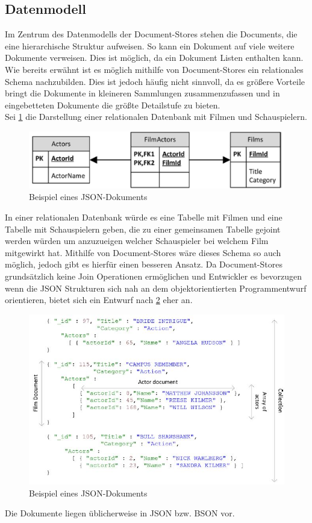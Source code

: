\subsection{Datenmodell}
Im Zentrum des Datenmodells der Document-Stores stehen die Documents, die eine hierarchische Struktur aufweisen. So kann ein Dokument auf viele weitere Dokumente verweisen. Dies ist möglich, da ein Dokument Listen enthalten kann. 
\\

Wie bereits erwähnt ist es möglich mithilfe von Document-Stores ein relationales Schema nachzubilden. Dies ist jedoch häufig nicht sinnvoll, da es größere Vorteile bringt die Dokumente in kleineren Sammlungen zusammenzufassen und in eingebetteten Dokumente die größte Detailstufe zu bieten. 
\\

Sei \ref{fig:doc2} die Darstellung einer relationalen Datenbank mit Filmen und Schauspielern.
\begin{figure}
	\centering
	\includegraphics[scale=0.4]{images/docstores_2.jpg} 
	\caption{Beispiel eines JSON-Dokuments}\label{fig:doc2}
\end{figure}
In einer relationalen Datenbank würde es eine Tabelle mit Filmen und eine Tabelle mit Schauspielern geben, die zu einer gemeinsamen Tabelle gejoint werden würden um anzuzueigen welcher Schauspieler bei welchem Film mitgewirkt hat. Mithilfe von Document-Stores wäre dieses Schema so auch möglich, jedoch gibt es hierfür einen besseren Ansatz. Da Document-Stores grundsätzlich keine Join Operationen ermöglichen und Entwickler es bevorzugen wenn die JSON Strukturen sich nah an dem objektorientierten Programmentwurf orientieren, bietet sich ein Entwurf nach \ref{fig:doc1} eher an.
\begin{figure}
	\centering
	\includegraphics[scale=0.75]{images/docstores_1.jpg}
	\caption{Beispiel eines JSON-Dokuments}\label{fig:doc1}
\end{figure}
Die Dokumente liegen üblicherweise in JSON bzw. BSON vor.

